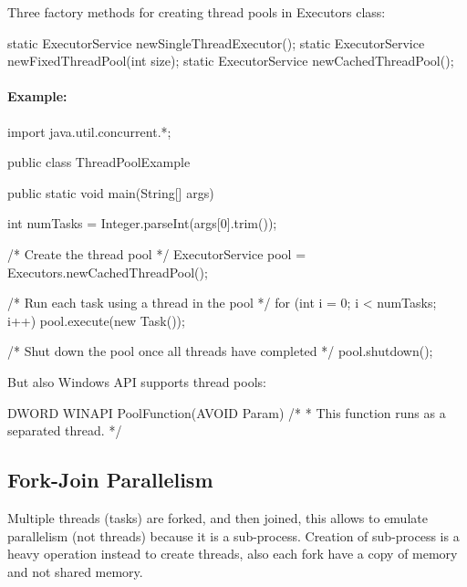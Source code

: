 Three factory methods for creating thread pools in Executors class:

\begin{codeInJava}
static ExecutorService newSingleThreadExecutor();
static ExecutorService newFixedThreadPool(int size);
static ExecutorService newCachedThreadPool();
    
\end{codeInJava}


\paragraph{Example:}

\begin{codeInJava}
import java.util.concurrent.*;

public class ThreadPoolExample {

    public static void main(String[] args) {
    
        int numTasks = Integer.parseInt(args[0].trim());
        
        /* Create the thread pool */
        ExecutorService pool = Executors.newCachedThreadPool();
        
        /* Run each task using a thread in the pool */
        for (int i = 0; i < numTasks; i++)        
            pool.execute(new Task());
        
        /* Shut down the pool once all threads have completed */
        pool.shutdown();    
    }
}
    
\end{codeInJava}
\newpage

But also Windows API supports thread pools:

\begin{codeInJava}
DWORD WINAPI PoolFunction(AVOID Param){
    /*
    * This function runs as a separated thread.
    */
}
    
\end{codeInJava}


\subsection{Fork-Join Parallelism}

Multiple threads (tasks) are forked, and then joined, this allows to emulate parallelism (not threads) because it is a sub-process. Creation of sub-process is a heavy operation instead to create threads, also each fork have a copy of memory and not shared memory.


